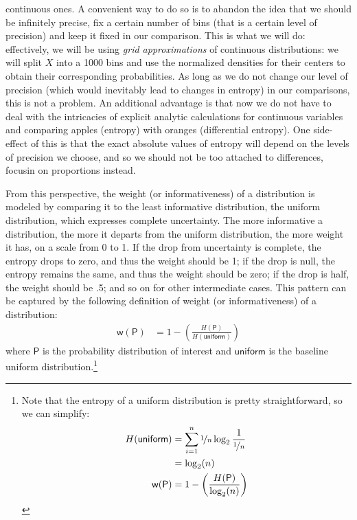 \documentclass[
  10pt,
  dvipsnames,enabledeprecatedfontcommands]{scrartcl}
\begin{document}
continuous ones. A convenient way to do so is to abandon the idea that
we should be infinitely precise, fix a certain number of bins (that is a
certain level of precision) and keep it fixed in our comparison. This is
what we will do: effectively, we will be using
\emph{grid approximations} of continuous distributions: we will split
\(X\) into a 1000 bins and use the normalized densities for their
centers to obtain their corresponding probabilities. As long as we do
not change our level of precision (which would inevitably lead to
changes in entropy) in our comparisons, this is not a problem. An
additional advantage is that now we do not have to deal with the
intricacies of explicit analytic calculations for continuous variables
and comparing apples (entropy) with oranges (differential entropy). One
side-effect of this is that the exact absolute values of entropy will
depend on the levels of precision we choose, and so we should not be too
attached to differences, focusin on proportions instead.

From this perspective, the weight (or informativeness) of a distribution
is modeled by comparing it to the least informative distribution, the
uniform distribution, which expresses complete uncertainty. The more
informative a distribution, the more it departs from the uniform
distribution, the more weight it has, on a scale from 0 to 1. If the
drop from uncertainty is complete, the entropy drops to zero, and thus
the weight should be 1; if the drop is null, the entropy remains the
same, and thus the weight should be zero; if the drop is half, the
weight should be .5; and so on for other intermediate cases. This
pattern can be captured by the following definition of weight (or
informativeness) of a distribution: \begin{align*}
\mathsf{w(P)} & = 1 - \left( \frac{H(\mathsf{P})}{H(\mathsf{uniform})}\right)
\end{align*} \noindent where \(\mathsf{P}\) is the probability
distribution of interest and \(\mathsf{uniform}\) is the baseline
uniform
distribution.\footnote{Note that the entropy of a uniform distribution is pretty straightforward, so we can simplify:
\begin{align*}
H(\mathsf{uniform}) & = \sum_{i=1}^n \nicefrac{1}{n} \log_2 \frac{1}{\nicefrac{1}{n}} \\
& = \log_2(n) \\
\mathsf{w(P)} & = 1 - \left( \frac{H(\mathsf{P})}{\log_2(n)}\right)
\end{align*}
}
\end{document}
